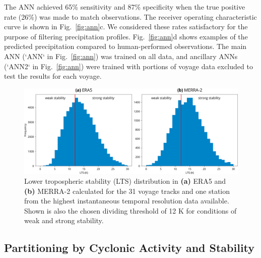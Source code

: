 \documentclass[draft]{agujournal2019}
\begin{document}
The ANN achieved 65\% sensitivity and 87\% specificity when the true positive rate (26\%) was made to match observations. The receiver operating characteristic curve is shown in Fig.~\ref{fig:ann}c. We considered these rates satisfactory for the purpose of filtering precipitation profiles. Fig.~\ref{fig:ann}d shows examples of the predicted precipitation compared to human-performed observations. The main ANN (`ANN` in Fig.~\ref{fig:ann}) was trained on all data, and ancillary ANNs (`ANN2` in Fig.~\ref{fig:ann}) were trained with portions of voyage data excluded to test the results for each voyage.

\begin{figure}[b!]
\centering
\includegraphics[width=\textwidth]{img/lts_dist.pdf}
\caption{
Lower tropospheric stability (LTS) distribution in \textbf{(a)} ERA5 and \textbf{(b)} MERRA-2 calculated for the 31 voyage tracks and one station from the highest instantaneous temporal resolution data available. Shown is also the chosen dividing threshold of 12 K for conditions of weak and strong stability.
}
\label{fig:lts}
\end{figure}

\subsection{Partitioning by Cyclonic Activity and Stability}
\label{sec:cyclone-stability}
\end{document}
